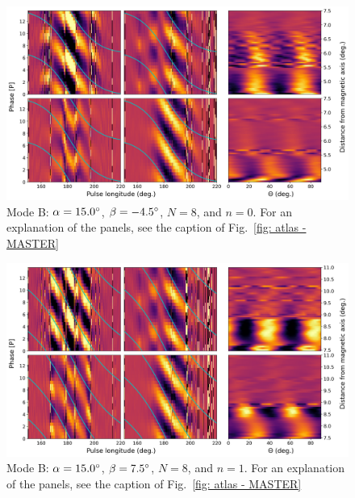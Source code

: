 \begin{figure}
	\begin{center}
		\includegraphics[width=\atlasHeightFrac\textwidth]{Figures/B0031/atlas/B_517015008000_plots}
		\caption[Atlas results: Mode B -- $\alpha=15.0\degr$, $\beta=-4.5\degr$, $N=8$, $n=0$]{Mode B: $\alpha=15.0\degr$, $\beta=-4.5\degr$, $N=8$, and $n=0$. For an explanation of the panels, see the caption of Fig.~\ref{fig: atlas - MASTER} }
		\label{fig: atlas - B_517015008000}
	\end{center}
\end{figure}

\begin{figure}
	\begin{center}
		\includegraphics[width=\atlasHeightFrac\textwidth]{Figures/B0031/atlas/B_517015008001_plots}
		\caption[Atlas results: Mode B -- $\alpha=15.0\degr$, $\beta=7.5\degr$, $N=8$, $n=1$]{Mode B: $\alpha=15.0\degr$, $\beta=7.5\degr$, $N=8$, and $n=1$. For an explanation of the panels, see the caption of Fig.~\ref{fig: atlas - MASTER} }
		\label{fig: atlas - B_517015008001}
	\end{center}
\end{figure}

